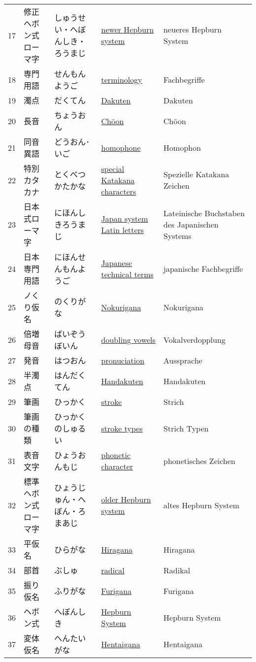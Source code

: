 \begin{longtable}[c]{p{.5cm}p{3.5cm}p{4cm}p{3.5cm}p{3.5cm}}
17&修正ヘボン式ローマ字&しゅうせい・へぼんしき・ろうまじ&\hyperref[sec:NewerHepburnSystem]{newer Hepburn system}&neueres Hepburn System\\
18&専門用語&せんもんようご&\hyperref[sec:Terminology]{terminology}&Fachbegriffe\\
19&濁点&だくてん&\hyperref[sec:Dakuten]{Dakuten}&Dakuten\\
20&長音&ちょうおん&\hyperref[sec:Choon]{Chōon}&Chōon\\
21&同音異語&どうおん･いご&\hyperref[sec:Homophone]{homophone}&Homophon\\
22&特別カタカナ&とくべつかたかな&\hyperref[sec:SpecialKatakanaCharacters]{special Katakana characters}&Spezielle Katakana Zeichen\\
23&日本式ローマ字&にほんしきろうまじ&\hyperref[sec:JapanSystemLatinLetters]{Japan system Latin letters}&Lateinische Buchstaben des Japanischen Systems\\
24&日本専門用語&にほんせんもんようご&\hyperref[sec:JapaneseTechnicalTerms]{Japanese technical terms}&japanische Fachbegriffe\\
25&ノくり仮名&のくりがな&\hyperref[sec:Nokurigana]{Nokurigana}&Nokurigana\\
26&倍増母音&ばいぞうぼいん&\hyperref[sec:DoublingVowels]{doubling vowels}&Vokalverdopplung\\
27&発音&はつおん&\hyperref[sec:Pronuciation]{pronuciation}&Aussprache\\
28&半濁点&はんだくてん&\hyperref[sec:Handakuten]{Handakuten}&Handakuten\\
29&筆画&ひっかく&\hyperref[sec:Stroke]{stroke}&Strich\\
30&筆画の種類&ひっかくのしゅるい&\hyperref[sec:StrokeTypes]{stroke types}&Strich Typen\\
31&表音文字&ひょうおんもじ&\hyperref[sec:PhoneticCharacter]{phonetic character}&phonetisches Zeichen\\
32&標準ヘボン式ローマ字&ひょうじゅん・へぼん・ろまあじ&\hyperref[sec:OlderHepburnSystem]{older Hepburn system}&altes Hepburn System\\
33&平仮名&ひらがな&\hyperref[sec:Hiragana]{Hiragana}&Hiragana\\
34&部首&ぶしゅ&\hyperref[sec:Radical]{radical}&Radikal\\
35&振り仮名&ふりがな&\hyperref[sec:Furigana]{Furigana}&Furigana\\
36&ヘボン式&へぼんしき&\hyperref[sec:HepburnSystem]{Hepburn System}&Hepburn System\\
37&変体仮名&へんたいがな&\hyperref[sec:Hentaigana]{Hentaigana}&Hentaigana\\

\end{longtable}
